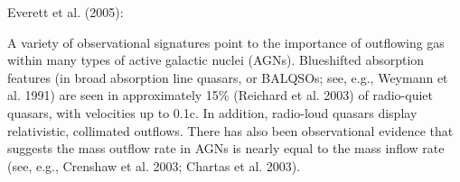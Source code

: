 Everett et al. (2005): 

A variety of observational signatures point to the importance of outflowing gas within many types of active galactic nuclei (AGNs). Blueshifted absorption features (in broad absorption line quasars, or BALQSOs; see, e.g., Weymann et al. 1991) are seen in approximately 15\% (Reichard et al. 2003) of radio-quiet quasars, with velocities up to 0.1c. In addition, radio-loud quasars display relativistic, collimated outflows. 
There has also been observational evidence that suggests the mass outflow rate in AGNs is nearly equal to the mass inflow rate (see, e.g., Crenshaw et al. 2003; Chartas et al. 2003).
